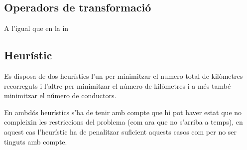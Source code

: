 \subsection{Operadors de transformació}
A l'igual que en la in


\subsection{Heurístic}
Es disposa de dos heurístics l'un per minimitzar el numero total de kilòmetres recorreguts i l'altre per
minimitzar el número de kilòmetres i a més també minimitzar el número de conductors.

En ambdós heurístics s'ha de tenir amb compte que hi pot haver estat que no compleixin les restriccions del problema
(com ara que no s'arriba a temps), en aquest cas l'heurístic ha de penalitzar suficient aquests casos com per no
ser tinguts amb compte.
